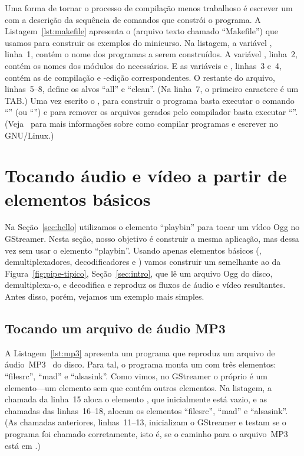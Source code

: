 \documentclass{SBCbookchapter}
\begin{document}
Uma forma de tornar o processo de compilação menos trabalhoso é escrever um
 com a descrição da sequência de comandos que constrói o
programa.  A Listagem~\ref{lst:makefile} apresenta o  (arquivo
texto chamado ``Makefile'') que usamos para construir os exemplos do
minicurso.  Na listagem, a variável , linha~1, contém o nome dos
programas a serem construídos.  A variável , linha~2, contém os
nomes dos módulos do  necessários.  E as variáveis 
e , linhas~3 e~4, contém as  de compilação e
-edição correspondentes.  O restante do arquivo, linhas~5--8,
define os alvos ``all'' e ``clean''.  (Na linha~7, o primeiro caractere é um
TAB\null.)  Uma vez escrito o , para construir o programa basta
executar o comando ``'' (ou ``'') e para remover os
arquivos gerados pelo compilador basta executar ``''.
(Veja~\cite{Gough-B-J-2005,Mecklenburg-R-2005} para mais informações sobre
como compilar programas e escrever  no GNU/Linux.)




\section{Tocando áudio e vídeo
a partir de elementos básicos}
\label{sec:dissec}

Na Seção~\ref{sec:hello} utilizamos o elemento ``playbin'' para tocar um
vídeo Ogg no GStreamer.  Nesta seção, nosso objetivo é construir a mesma
aplicação, mas dessa vez sem usar o elemento ``playbin''.  Usando apenas
elementos básicos (, demultiplexadores, decodificadores e
) vamos construir um  semelhante ao da
Figura~\ref{fig:pipe-tipico}, Seção~\ref{sec:intro}, que lê um arquivo Ogg
do disco, demultiplexa-o, e decodifica e reproduz os fluxos de áudio e vídeo
resultantes.  Antes disso, porém, vejamos um exemplo mais simples.


\subsection*{Tocando um arquivo de áudio MP3}

A Listagem~\ref{lst:mp3} apresenta um programa que reproduz um arquivo de
áudio~MP3~\cite{mp3} do disco.  Para tal, o programa monta um 
com três elementos: ``filesrc'', ``mad'' e ``alsasink''.  Como vimos, no
GStreamer o próprio  é um elemento---um elemento sem 
que contém outros elementos.  Na listagem, a chamada da linha~15 aloca o
elemento , que inicialmente está vazio, e as chamadas das
linhas~16--18, alocam os elementos ``filesrc'', ``mad'' e ``alsasink''.  (As
chamadas anteriores, linhas~11--13, inicializam o GStreamer e testam se o
programa foi chamado corretamente, isto é, se o caminho para o arquivo~MP3
está em .)
\end{document}
